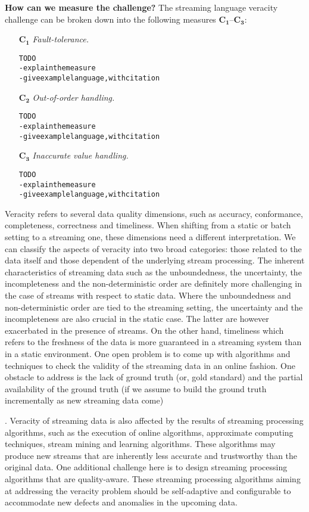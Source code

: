 \textbf{How can we measure the challenge?}
The streaming language veracity challenge can be broken down
into the following measures $\mathbf{C_1}$--$\mathbf{C_3}$:

\begin{itemize}
  \item[$\mathbf{C_1}$] \emph{Fault-tolerance.}
    \begin{alltt}TODO\scriptsize
- explain the measure
- give example language, with citation
    \end{alltt}
  \item[$\mathbf{C_2}$] \emph{Out-of-order handling.}
    \begin{alltt}TODO\scriptsize
- explain the measure
- give example language, with citation
    \end{alltt}
  \item[$\mathbf{C_3}$] \emph{Inaccurate value handling.}
    \begin{alltt}TODO\scriptsize
- explain the measure
- give example language, with citation
    \end{alltt}
\end{itemize}

Veracity refers to several data quality dimensions, such as accuracy, conformance, completeness, correctness and timeliness. When shifting from a static or batch setting to a streaming one, these dimensions need a different interpretation. We can classify the aspects of veracity into two broad categories: those related to the data itself and those dependent of the underlying stream processing. The inherent characteristics of streaming data such as the unboundedness, the uncertainty, the incompleteness and the non-deterministic order are definitely more challenging in the case of streams with respect to static data. Where the unboundedness and non-deterministic order are tied to the streaming setting, the uncertainty and the incompleteness are also crucial in the static case. The latter are however exacerbated in the presence of streams. On the other hand, timeliness which refers to the freshness of the data is more guaranteed in a streaming system than in a static environment. 
One open problem is to come up with algorithms and techniques to check the validity of the streaming data in an online fashion. One obstacle to address is the lack of ground truth (or, gold standard) and the partial availability of the ground truth (if we assume to build the ground truth incrementally as new streaming data come)


. 
Veracity of streaming data is also affected by the results of streaming processing algorithms, such as the execution of online algorithms, approximate computing techniques, stream mining and learning algorithms.  These algorithms may produce new streams that are inherently less accurate and trustworthy than the original data. One additional challenge here is to design streaming processing algorithms that are quality-aware.  These streaming processing algorithms aiming at addressing the veracity problem should be self-adaptive and configurable to accommodate new defects and anomalies in the upcoming data. 



